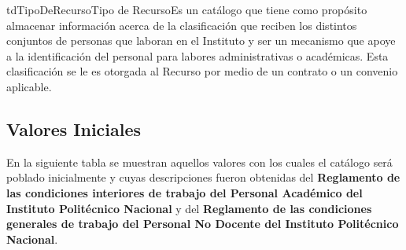 \begin{TipoDeDato}{tdTipoDeRecurso}{Tipo de Recurso}{Es un catálogo que tiene como propósito almacenar información acerca  de la clasificación que reciben los distintos conjuntos de personas que laboran en el Instituto y ser un mecanismo que apoye a la identificación del personal para labores administrativas o académicas. Esta clasificación se le es otorgada al Recurso  por medio de un contrato o un convenio aplicable. }
		
		\begin{tdAtributos}
			
		\end{tdAtributos}
		
		\subsection{Valores Iniciales}
		
		 En la siguiente tabla se muestran aquellos valores con los cuales el catálogo será poblado inicialmente y cuyas descripciones fueron obtenidas del \textbf{Reglamento de las condiciones interiores de trabajo del Personal Académico del Instituto Politécnico Nacional} y del \textbf{Reglamento de las condiciones generales de trabajo del Personal No Docente del Instituto Politécnico Nacional}. \cdtEmpty
		

\end{TipoDeDato}
